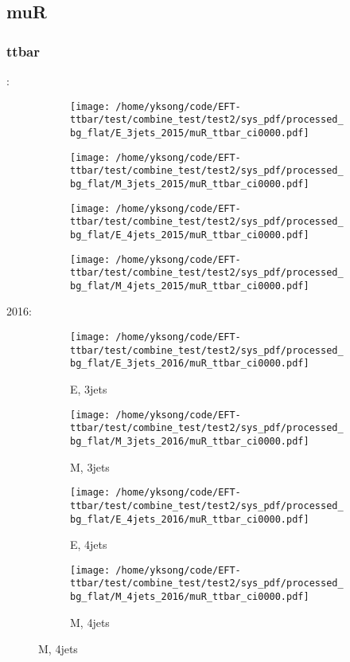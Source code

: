 \documentclass{beamer}
\begin{document}
\subsection{muR}

\begin{frame}
\frametitle{ttbar}
\fontsize{5}{1}:
\begin{figure}
\centering
\begin{subfigure}[b]{0.24\textwidth}
\texttt{[image: /home/yksong/code/EFT-ttbar/test/combine\_test/test2/sys\_pdf/processed\_bg\_flat/E\_3jets\_2015/muR\_ttbar\_ci0000.pdf]}
\end{subfigure}
\begin{subfigure}[b]{0.24\textwidth}
\texttt{[image: /home/yksong/code/EFT-ttbar/test/combine\_test/test2/sys\_pdf/processed\_bg\_flat/M\_3jets\_2015/muR\_ttbar\_ci0000.pdf]}
\end{subfigure}
\begin{subfigure}[b]{0.24\textwidth}
\texttt{[image: /home/yksong/code/EFT-ttbar/test/combine\_test/test2/sys\_pdf/processed\_bg\_flat/E\_4jets\_2015/muR\_ttbar\_ci0000.pdf]}
\end{subfigure}
\begin{subfigure}[b]{0.24\textwidth}
\texttt{[image: /home/yksong/code/EFT-ttbar/test/combine\_test/test2/sys\_pdf/processed\_bg\_flat/M\_4jets\_2015/muR\_ttbar\_ci0000.pdf]}
\end{subfigure}
\end{figure}
2016:
\begin{figure}
\centering
\begin{subfigure}[b]{0.24\textwidth}
\texttt{[image: /home/yksong/code/EFT-ttbar/test/combine\_test/test2/sys\_pdf/processed\_bg\_flat/E\_3jets\_2016/muR\_ttbar\_ci0000.pdf]}
\captionsetup{font=tiny}
\caption{E, 3jets}
\end{subfigure}
\begin{subfigure}[b]{0.24\textwidth}
\texttt{[image: /home/yksong/code/EFT-ttbar/test/combine\_test/test2/sys\_pdf/processed\_bg\_flat/M\_3jets\_2016/muR\_ttbar\_ci0000.pdf]}
\captionsetup{font=tiny}
\caption{M, 3jets}
\end{subfigure}
\begin{subfigure}[b]{0.24\textwidth}
\texttt{[image: /home/yksong/code/EFT-ttbar/test/combine\_test/test2/sys\_pdf/processed\_bg\_flat/E\_4jets\_2016/muR\_ttbar\_ci0000.pdf]}
\captionsetup{font=tiny}
\caption{E, 4jets}
\end{subfigure}
\begin{subfigure}[b]{0.24\textwidth}
\texttt{[image: /home/yksong/code/EFT-ttbar/test/combine\_test/test2/sys\_pdf/processed\_bg\_flat/M\_4jets\_2016/muR\_ttbar\_ci0000.pdf]}
\captionsetup{font=tiny}
\caption{M, 4jets}
\end{subfigure}
\end{figure}
\end{frame}
\end{document}
